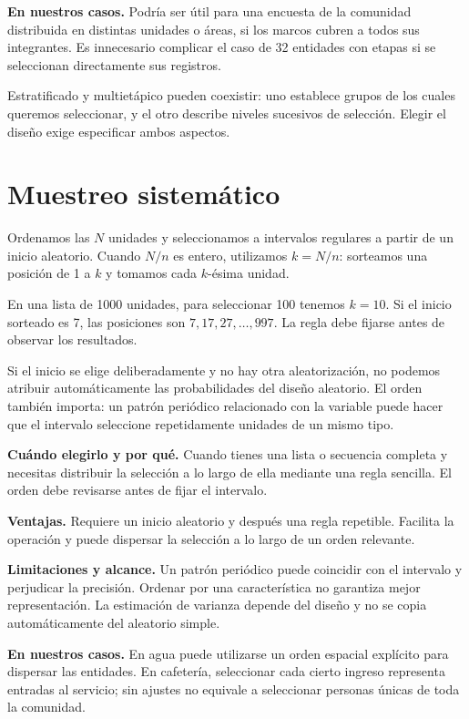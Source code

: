 \documentclass[11pt,letterpaper]{article}
\begin{document}
\textbf{En nuestros casos.} Podría ser útil para una encuesta de la comunidad distribuida en distintas unidades o áreas, si los marcos cubren a todos sus integrantes. Es innecesario complicar el caso de 32 entidades con etapas si se seleccionan directamente sus registros.

Estratificado y multietápico pueden coexistir: uno establece grupos de los cuales queremos seleccionar, y el otro describe niveles sucesivos de selección. Elegir el diseño exige especificar ambos aspectos.
\clearpage

\section{Muestreo sistemático}
Ordenamos las $N$ unidades y seleccionamos a intervalos regulares a partir de un inicio aleatorio. Cuando $N/n$ es entero, utilizamos $k=N/n$: sorteamos una posición de 1 a $k$ y tomamos cada $k$-ésima unidad.

En una lista de 1000 unidades, para seleccionar 100 tenemos $k=10$. Si el inicio sorteado es 7, las posiciones son $7,17,27,\ldots,997$. La regla debe fijarse antes de observar los resultados.

Si el inicio se elige deliberadamente y no hay otra aleatorización, no podemos atribuir automáticamente las probabilidades del diseño aleatorio. El orden también importa: un patrón periódico relacionado con la variable puede hacer que el intervalo seleccione repetidamente unidades de un mismo tipo.

\textbf{Cuándo elegirlo y por qué.} Cuando tienes una lista o secuencia completa y necesitas distribuir la selección a lo largo de ella mediante una regla sencilla. El orden debe revisarse antes de fijar el intervalo.

\textbf{Ventajas.} Requiere un inicio aleatorio y después una regla repetible. Facilita la operación y puede dispersar la selección a lo largo de un orden relevante.

\textbf{Limitaciones y alcance.} Un patrón periódico puede coincidir con el intervalo y perjudicar la precisión. Ordenar por una característica no garantiza mejor representación. La estimación de varianza depende del diseño y no se copia automáticamente del aleatorio simple.

\textbf{En nuestros casos.} En agua puede utilizarse un orden espacial explícito para dispersar las entidades. En cafetería, seleccionar cada cierto ingreso representa entradas al servicio; sin ajustes no equivale a seleccionar personas únicas de toda la comunidad.
\clearpage
\end{document}
